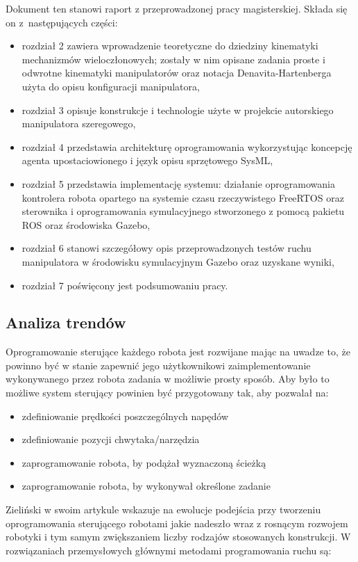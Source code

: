 \documentclass[a4paper, 12pt, twoside]{article}
\begin{document}
Dokument ten stanowi raport z przeprowadzonej pracy magisterskiej. Składa się on z~następujących części:
\begin{itemize}
\item rozdział 2 zawiera wprowadzenie teoretyczne do dziedziny kinematyki mechanizmów wieloczłonowych; zostały w nim opisane zadania proste i odwrotne kinematyki manipulatorów oraz notacja Denavita-Hartenberga użyta do opisu konfiguracji manipulatora,
\item rozdział 3 opisuje konstrukcje i technologie użyte w projekcie autorskiego manipulatora szeregowego,
\item rozdział 4 przedstawia architekturę oprogramowania wykorzystując koncepcję agenta upostaciowionego i język opisu sprzętowego SysML,
\item rozdział 5 przedstawia implementację systemu: działanie oprogramowania kontrolera robota opartego na systemie czasu rzeczywistego FreeRTOS oraz sterownika i oprogramowania symulacyjnego stworzonego z pomocą pakietu ROS oraz środowiska Gazebo,
\item rozdział 6 stanowi szczegółowy opis przeprowadzonych testów ruchu manipulatora w środowisku symulacyjnym Gazebo oraz uzyskane wyniki,
\item rozdział 7 poświęcony jest podsumowaniu pracy.  
\end{itemize} 

\subsection{Analiza trendów}

Oprogramowanie sterujące każdego robota jest rozwijane mając na uwadze to, że powinno być w stanie zapewnić jego użytkownikowi zaimplementowanie wykonywanego przez robota zadania w możliwie prosty sposób. Aby było to możliwe system sterujący powinien być przygotowany tak, aby pozwalał na:

\begin{itemize}
\item zdefiniowanie prędkości poszczególnych napędów
\item zdefiniowanie pozycji chwytaka/narzędzia
\item zaprogramowanie robota, by podążał wyznaczoną ścieżką
\item zaprogramowanie robota, by wykonywał określone zadanie
\end{itemize}

Zieliński w swoim artykule \cite{ramowezielinski} wskazuje na ewolucje podejścia przy tworzeniu oprogramowania sterującego robotami jakie nadeszło wraz z rosnącym rozwojem robotyki i tym samym zwiększaniem liczby rodzajów stosowanych konstrukcji. W rozwiązaniach przemysłowych głównymi metodami programowania ruchu są:
\end{document}
